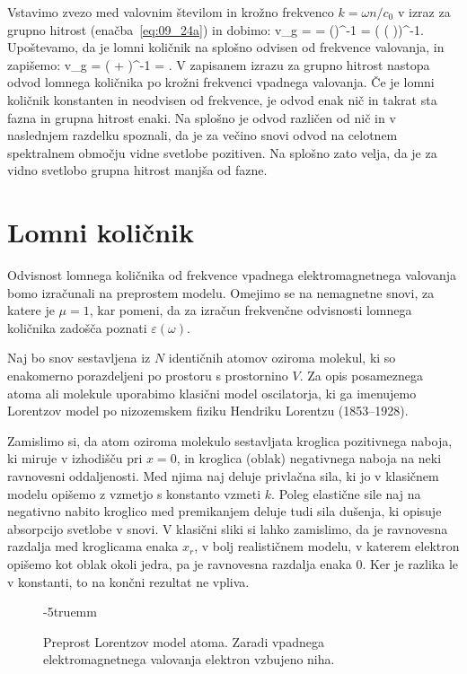 Vstavimo zvezo med valovnim številom in krožno frekvenco $k=\omega n /c_0$ v izraz za 
grupno hitrost (enačba~\ref{eq:09_24a}) in dobimo:
\beq
v_g =  = \left(\right)^{-1} = \left( \left( 
\right)\!\right)^{-1}\!\!.
\label{eq:09_25}
\eeq
Upoštevamo, da je lomni količnik na splošno odvisen od frekvence valovanja, in zapišemo:
\beq
v_g = \left( + \right)^{-1} = 
.
\label{eq:09_26}
\eeq
V zapisanem izrazu za grupno hitrost nastopa odvod lomnega količnika po krožni frekvenci vpadnega
valovanja. Če je lomni količnik konstanten in neodvisen od frekvence, je odvod enak nič in 
takrat sta fazna in grupna hitrost enaki. Na splošno je odvod različen od nič in v naslednjem razdelku
spoznali, da je za večino snovi odvod na celotnem spektralnem območju vidne svetlobe pozitiven.
Na splošno zato velja, da je za vidno svetlobo grupna hitrost manjša od fazne.

\section{Lomni količnik}
Odvisnost lomnega količnika od frekvence vpadnega 
elektromagnetnega valovanja bomo izračunali na preprostem modelu. 
Omejimo se na nemagnetne snovi, za katere je $\mu = 1$, kar pomeni, da
za izračun frekvenčne odvisnosti lomnega količnika zadošča poznati 
$\varepsilon(\omega)$. 

Naj bo snov sestavljena iz $N$
identičnih atomov oziroma molekul, ki so enakomerno porazdeljeni
po prostoru s prostornino $V$. Za opis posameznega atoma ali molekule uporabimo 
klasični model oscilatorja, ki ga imenujemo Lorentzov model 
po nizozemskem fiziku Hendriku Lorentzu (1853--1928). 

Zamislimo si, da atom oziroma molekulo sestavljata kroglica 
pozitivnega naboja, ki miruje v izhodišču pri $x=0$, in kroglica
(oblak) negativnega naboja na neki ravnovesni oddaljenosti. Med njima naj 
deluje privlačna sila, ki jo v klasičnem modelu opišemo z vzmetjo
s konstanto vzmeti $k$. 
Poleg elastične sile naj na negativno nabito kroglico med 
premikanjem deluje tudi sila dušenja, ki opisuje absorpcijo svetlobe
v snovi. V klasični sliki si lahko
zamislimo, da je ravnovesna razdalja med kroglicama enaka $x_r$, 
v bolj realističnem modelu, v katerem elektron opišemo kot oblak okoli jedra, 
pa je ravnovesna razdalja enaka 0. Ker je razlika le v konstanti, 
to na končni rezultat ne vpliva.
\begin{figure}[ht]
\centering
\def\svgwidth{60truemm} 

\caption{Preprost Lorentzov model atoma. Zaradi vpadnega 
elektromagnetnega valovanja elektron vzbujeno niha.
}
\label{fig:09_Lorentz}
\vglue-5truemm
\end{figure}

